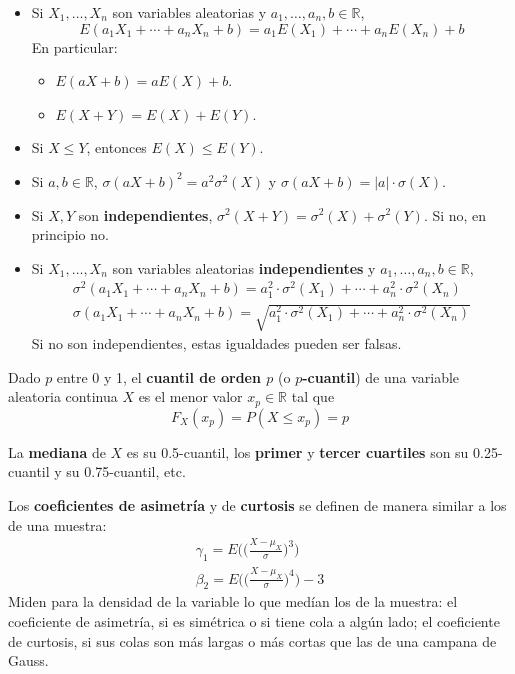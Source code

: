 \documentclass[
  spanish,
  letterpaper,
  DIV=11,
  numbers=noendperiod]{scrreprt}
\begin{document}
\begin{itemize}
\item
  Si \(X_1,\ldots,X_n\) son variables aleatorias y
  \(a_1,\ldots,a_n,b\in \mathbb{R}\), \[
  E(a_1X_1+\cdots+a_nX_n+b)=a_1E(X_1)+\cdots+a_nE(X_n)+b
  \] En particular:

  \begin{itemize}
  \item
    \(E(a X+b)=a E(X)+b\).
  \item
    \(E(X+Y)=E(X)+E(Y)\).
  \end{itemize}
\item
  Si \(X\leqslant Y\), entonces \(E(X)\leqslant E(Y)\).
\item
  Si \(a,b\in \mathbb{R}\), \(\sigma(aX+b)^2=a^2 \sigma^2(X)\) y
  \(\sigma(aX+b)=|a|\cdot \sigma(X)\).
\item
  Si \(X,Y\) son \textbf{independientes},
  \(\sigma^2(X+Y)=\sigma^2(X)+\sigma^2(Y)\). Si no, en principio no.
\item
  Si \(X_1,\ldots,X_n\) son variables aleatorias \textbf{independientes}
  y \(a_1,\ldots,a_n,b\in \mathbb{R}\), \[
  \begin{array}{l}
  \sigma^2(a_1X_1+\cdots+a_nX_n+b)=a_1^2\cdot\sigma^2(X_1)+\cdots+a_n^2\cdot\sigma^2(X_n)\\
  \sigma(a_1X_1+\cdots+a_nX_n+b)=\sqrt{a_1^2\cdot\sigma^2(X_1)+\cdots+a_n^2\cdot\sigma^2(X_n)}
  \end{array}
  \] Si no son independientes, estas igualdades pueden ser falsas.
\end{itemize}

Dado \(p\) entre 0 y 1, el \textbf{cuantil de orden \(p\)} (o
\textbf{\(p\)-cuantil}) de una variable aleatoria continua \(X\) es el
menor valor \(x_p\in \mathbb{R}\) tal que \[
F_X(x_p)=P(X\leqslant x_p)=p
\]

La \textbf{mediana} de \(X\) es su 0.5-cuantil, los \textbf{primer} y
\textbf{tercer cuartiles} son su 0.25-cuantil y su 0.75-cuantil, etc.

Los \textbf{coeficientes de asimetría} y de \textbf{curtosis} se definen
de manera similar a los de una muestra: \[
\begin{array}{l}
\displaystyle \gamma_1=E\Big(\Big(\frac{X-\mu_X}{\sigma}\Big)^3\Big)\\
\displaystyle \beta_2=E\Big(\Big(\frac{X-\mu_X}{\sigma}\Big)^4\Big)-3
\end{array}
\] Miden para la densidad de la variable lo que medían los de la
muestra: el coeficiente de asimetría, si es simétrica o si tiene cola a
algún lado; el coeficiente de curtosis, si sus colas son más largas o
más cortas que las de una campana de Gauss.
\end{document}
